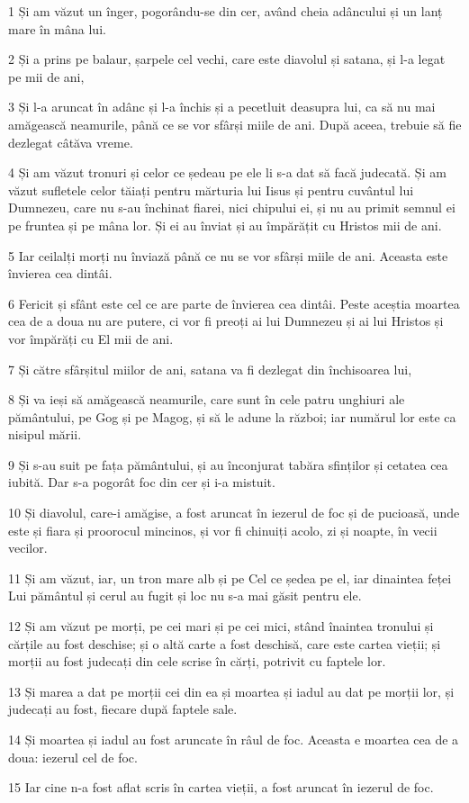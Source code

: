 \par 1 Și am văzut un înger, pogorându-se din cer, având cheia adâncului și un lanț mare în mâna lui.
\par 2 Și a prins pe balaur, șarpele cel vechi, care este diavolul și satana, și l-a legat pe mii de ani,
\par 3 Și l-a aruncat în adânc și l-a închis și a pecetluit deasupra lui, ca să nu mai amăgească neamurile, până ce se vor sfârși miile de ani. După aceea, trebuie să fie dezlegat câtăva vreme.
\par 4 Și am văzut tronuri și celor ce ședeau pe ele li s-a dat să facă judecată. Și am văzut sufletele celor tăiați pentru mărturia lui Iisus și pentru cuvântul lui Dumnezeu, care nu s-au închinat fiarei, nici chipului ei, și nu au primit semnul ei pe fruntea și pe mâna lor. Și ei au înviat și au împărățit cu Hristos mii de ani.
\par 5 Iar ceilalți morți nu înviază până ce nu se vor sfârși miile de ani. Aceasta este învierea cea dintâi.
\par 6 Fericit și sfânt este cel ce are parte de învierea cea dintâi. Peste aceștia moartea cea de a doua nu are putere, ci vor fi preoți ai lui Dumnezeu și ai lui Hristos și vor împărăți cu El mii de ani.
\par 7 Și către sfârșitul miilor de ani, satana va fi dezlegat din închisoarea lui,
\par 8 Și va ieși să amăgească neamurile, care sunt în cele patru unghiuri ale pământului, pe Gog și pe Magog, și să le adune la război; iar numărul lor este ca nisipul mării.
\par 9 Și s-au suit pe fața pământului, și au înconjurat tabăra sfinților și cetatea cea iubită. Dar s-a pogorât foc din cer și i-a mistuit.
\par 10 Și diavolul, care-i amăgise, a fost aruncat în iezerul de foc și de pucioasă, unde este și fiara și proorocul mincinos, și vor fi chinuiți acolo, zi și noapte, în vecii vecilor.
\par 11 Și am văzut, iar, un tron mare alb și pe Cel ce ședea pe el, iar dinaintea feței Lui pământul și cerul au fugit și loc nu s-a mai găsit pentru ele.
\par 12 Și am văzut pe morți, pe cei mari și pe cei mici, stând înaintea tronului și cărțile au fost deschise; și o altă carte a fost deschisă, care este cartea vieții; și morții au fost judecați din cele scrise în cărți, potrivit cu faptele lor.
\par 13 Și marea a dat pe morții cei din ea și moartea și iadul au dat pe morții lor, și judecați au fost, fiecare după faptele sale.
\par 14 Și moartea și iadul au fost aruncate în râul de foc. Aceasta e moartea cea de a doua: iezerul cel de foc.
\par 15 Iar cine n-a fost aflat scris în cartea vieții, a fost aruncat în iezerul de foc.


